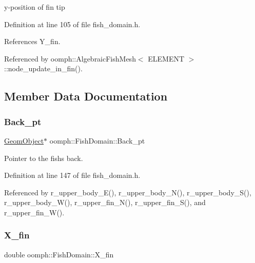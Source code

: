 y-\/position of fin tip 



Definition at line 105 of file fish\+\_\+domain.\+h.



References Y\+\_\+fin.



Referenced by oomph\+::\+Algebraic\+Fish\+Mesh$<$ E\+L\+E\+M\+E\+N\+T $>$\+::node\+\_\+update\+\_\+in\+\_\+fin().



\subsection{Member Data Documentation}
\mbox{\label{classoomph_1_1FishDomain_ae943e7fe48ce09dded2d5351ab980f93}} 
\subsubsection{\texorpdfstring{Back\+\_\+pt}{Back\_pt}}
{\footnotesize\ttfamily \hyperlink{classoomph_1_1GeomObject}{Geom\+Object}$\ast$ oomph\+::\+Fish\+Domain\+::\+Back\+\_\+pt\hspace{0.3cm}{\ttfamily [private]}}



Pointer to the fish\textquotesingle{}s back. 



Definition at line 147 of file fish\+\_\+domain.\+h.



Referenced by r\+\_\+upper\+\_\+body\+\_\+\+E(), r\+\_\+upper\+\_\+body\+\_\+\+N(), r\+\_\+upper\+\_\+body\+\_\+\+S(), r\+\_\+upper\+\_\+body\+\_\+\+W(), r\+\_\+upper\+\_\+fin\+\_\+\+N(), r\+\_\+upper\+\_\+fin\+\_\+\+S(), and r\+\_\+upper\+\_\+fin\+\_\+\+W().

\mbox{\label{classoomph_1_1FishDomain_af27c51fe0272df3dec2ad93c5c231d59}} 
\subsubsection{\texorpdfstring{X\+\_\+fin}{X\_fin}}
{\footnotesize\ttfamily double oomph\+::\+Fish\+Domain\+::\+X\+\_\+fin\hspace{0.3cm}{\ttfamily [private]}}



